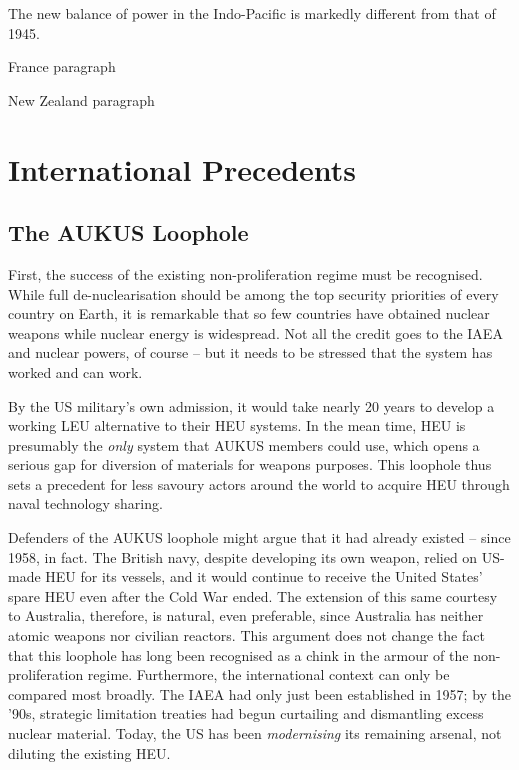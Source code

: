 \documentclass[letterpaper,12pt,twoside]{article} %
\begin{document}
\begin{multicols}{2}
The new balance of power in the Indo-Pacific is markedly different from that of 1945.

France paragraph

New Zealand paragraph

\section{International Precedents}

\subsection{The AUKUS Loophole}

First, the success of the existing non-proliferation regime must be recognised. While full de-nuclearisation should be among the top security priorities of every country on Earth, it is remarkable that so few countries have obtained nuclear weapons while nuclear energy is widespread. Not all the credit goes to the IAEA and nuclear powers, of course -- but it needs to be stressed that the system has worked and can work.

By the US military's own admission, it would take nearly 20 years to develop a working LEU alternative to their HEU systems. In the mean time, HEU is presumably the \textit{only} system that AUKUS members could use, which opens a serious gap for diversion of materials for weapons purposes. This loophole thus sets a precedent for less savoury actors around the world to acquire HEU through naval technology sharing.

Defenders of the AUKUS loophole might argue that it had already existed -- since 1958, in fact. The British navy, despite developing its own weapon, relied on US-made HEU for its vessels, and it would continue to receive the United States' spare HEU even after the Cold War ended.\autocite[39. Footnote 32.]{hippel2016banning} The extension of this same courtesy to Australia, therefore, is natural, even preferable, since Australia has neither atomic weapons nor civilian reactors. This argument does not change the fact that this loophole has long been recognised as a chink in the armour of the non-proliferation regime. Furthermore, the international context can only be compared most broadly. The IAEA had only just been established in 1957; by the '90s, strategic limitation treaties had begun curtailing and dismantling excess nuclear material. Today, the US has been \textit{modernising} its remaining arsenal, not diluting the existing HEU.


\end{multicols}
\end{document}
